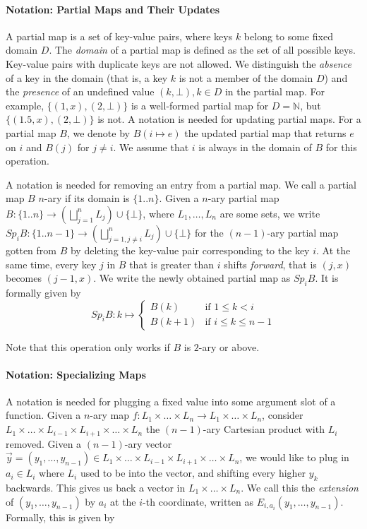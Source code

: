 \paragraph*{Notation: Partial Maps and Their Updates}
A partial map is a set of key-value pairs, where keys $k$ belong to some fixed domain $D$. The \textit{domain} of a partial map is defined as the set of all possible keys. Key-value pairs with duplicate keys are not allowed. We distinguish the \textit{absence} of a key in the domain (that is, a key $k$ is not a member of the domain $D$) and the \textit{presence} of an undefined value $(k,\bot), k\in D$ in the partial map. For example, $\{(1,x),(2,\bot)\}$ is a well-formed partial map for $D=\mathbb N$, but $\{(1.5,x),(2,\bot)\}$ is not. 
A notation is needed for updating partial maps. For a partial map $B$, we denote by $B(i\mapsto e)$ the updated partial map that returns $e$ on $i$ and $B(j)$ for $j\neq i$. We assume that $i$ is always in the domain of $B$ for this operation.

A notation is needed for removing an entry from a partial map. We call a partial map $B$ $n$-ary if its domain is $\{1..n\}$. Given a $n$-ary partial map $B:\{1..n\}\rightarrow (\bigsqcup_{j=1}^n L_j)\cup \{\bot\}$, where $L_1,\dots,L_n$ are some sets, we write $Sp_iB:\{1..n-1\}\rightarrow (\bigsqcup_{j=1, j\neq i}^n L_j)\cup \{\bot\}$ for the $(n-1)$-ary partial map gotten from $B$ by deleting the key-value pair corresponding to the key $i$. At the same time, every key $j$ in $B$ that is greater than $i$ shifts \textit{forward}, that is $(j,x)$ becomes $(j-1,x)$. We write the newly obtained partial map as $Sp_iB$. It is formally given by
\begin{equation}
    Sp_iB: k\mapsto \begin{cases}
        B(k) & \text{if } 1\leq k<i \\
        B(k+1) & \text{if } i\leq k\leq n-1
    \end{cases}
\end{equation}

Note that this operation only works if $B$ is $2$-ary or above.

\paragraph*{Notation: Specializing Maps}

A notation is needed for plugging a fixed value into some argument slot of a function. Given a $n$-ary map $f:L_1\times\dots\times L_n\rightarrow L_1\times\dots\times L_n$, consider $L_1\times\dots \times L_{i-1} \times L_{i+1} \times\dots \times L_n$ the $(n-1)$-ary Cartesian product with $L_i$ removed. Given a $(n-1)$-ary vector $\vec{y}=(y_1,\dots,y_{n-1})\in L_1\times\dots \times L_{i-1} \times L_{i+1} \times\dots \times L_n$, we would like to plug in $a_i\in L_i$ where $L_i$ used to be into the vector, and shifting every higher $y_k$ backwards. This gives us back a vector in $L_1\times\dots \times L_n$. We call this the \textit{extension} of $(y_1,\dots,y_{n-1})$ by $a_i$ at the $i$-th coordinate, written as $E_{i,a_i}(y_1,\dots,y_{n-1})$. Formally, this is given by

